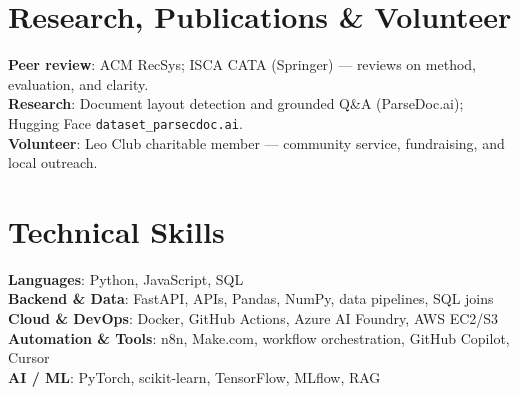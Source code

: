 \documentclass[letterpaper,11pt]{article}
\begin{document}
\section{Research, Publications \& Volunteer}
 \begin{itemize}[leftmargin=0.15in, label={}, topsep=1pt]
    \small{\item{
     \textbf{Peer review}{: ACM RecSys; ISCA CATA (Springer) --- reviews on method, evaluation, and clarity.} \\
     \textbf{Research}{: Document layout detection and grounded Q\&A (ParseDoc.ai); Hugging Face \texttt{dataset\_parsecdoc.ai}.} \\
     \textbf{Volunteer}{: Leo Club charitable member --- community service, fundraising, and local outreach.}
    }}
 \end{itemize}

\section{Technical Skills}
 \begin{itemize}[leftmargin=0.15in, label={}]
    \small{\item{
     \textbf{Languages}{: Python, JavaScript, SQL} \\
     \textbf{Backend \& Data}{: FastAPI, APIs, Pandas, NumPy, data pipelines, SQL joins} \\
     \textbf{Cloud \& DevOps}{: Docker, GitHub Actions, Azure AI Foundry, AWS EC2/S3} \\
     \textbf{Automation \& Tools}{: n8n, Make.com, workflow orchestration, GitHub Copilot, Cursor} \\
     \textbf{AI / ML}{: PyTorch, scikit-learn, TensorFlow, MLflow, RAG}

    }}
 \end{itemize}
\end{document}
